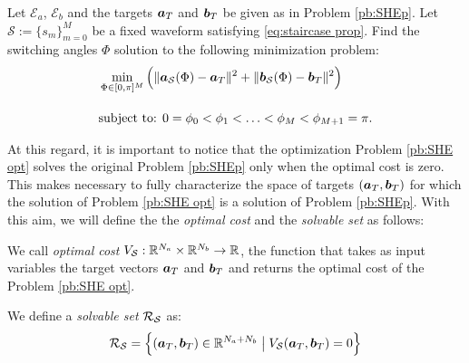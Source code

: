 \documentclass[twocolumn]{autart}    %
\begin{document}
\begin{problem}\label{pb:SHE opt}
Let $\mathcal{E}_a$, $\mathcal{E}_b$ and the targets $\bm{a}_T$ and $\bm{b}_T$ be given as in Problem \ref{pb:SHEp}.  Let $\mathcal S := \{ s_m\}_{m=0}^M$ be a fixed waveform satisfying \eqref{eq:staircase prop}.  Find the switching angles $\Phi$ solution to the following minimization problem:
\begin{align}
	&\min_{\Phi \in [0,\pi]^{M}} \Big( \|\bm{a}_{\mathcal{S}} (\Phi) - \bm{a}_T\|^2 + \| \bm{b}_{\mathcal{S}} (\Phi) - \bm{b}_T\|^2\Big)\notag 
	\\[10pt]
	&\mbox{subject to: } 0 = \phi_0 <\phi_1 < \ldots < \phi_{M} < \phi_{M+1} = \pi. \notag 
\end{align}
\end{problem}
At this regard, it is important to notice that the optimization Problem \ref{pb:SHE opt} solves the original Problem \ref{pb:SHEp} only when the optimal cost is zero. This makes necessary to fully characterize the space of targets $(\bm{a}_T,\bm{b}_T)$ for which the solution of Problem \ref{pb:SHE opt} is a solution of Problem \ref{pb:SHEp}. With this aim, we will define the the \textit{optimal cost} and the \textit{solvable set} as follows:
\vspace{1em}
\begin{definition}
We call \textit{optimal cost} $V_{\mathcal{S}}:\mathbb{R}^{N_a}\times \mathbb{R}^{N_b} \rightarrow \mathbb{R}$, the function that takes as input variables the target vectors $\bm{a}_T$ and $\bm{b}_T$ and returns the optimal cost of the Problem \ref{pb:SHE opt}.
\end{definition}

\vspace{1em}
\begin{definition}
We define a \textit{solvable set} $\mathcal{R}_{\mathcal{S}}$ as:
\begin{gather}
	\mathcal{R}_{\mathcal{S}} = \Big\{ (\bm{a}_T,\bm{b}_T) \in \mathbb{R}^{N_a+N_b}\;\big|\; V_{\mathcal{S}}(\bm{a}_T,\bm{b}_T) = 0\Big\}
\end{gather}
\end{definition}
\end{document}
